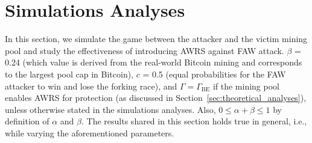 \section{Simulations Analyses}
\label{sec:simulations}

In this section, we simulate the game between the attacker and the victim mining pool and study the effectiveness of introducing AWRS against FAW attack.
$\beta$ = 0.24 (which value is derived from the real-world Bitcoin mining and corresponds to the largest pool cap in Bitcoin), $c$ = 0.5 (equal probabilities for the FAW attacker to win and lose the forking race), and $\Gamma = \Gamma_{\mbox{BE}}$ %
if the mining pool enables AWRS for protection (as discussed in Section~\ref{sec:theoretical_analyses}), unless otherwise stated in the simulations analyses.
Also, $0 \leq \alpha+\beta \leq 1$ by definition of $\alpha$ and $\beta$.
The results shared in this section holds true in general, i.e., while varying the aforementioned parameters.




